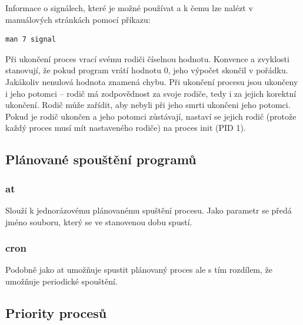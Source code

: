 \documentclass{article}
\begin{document}
Informace o signálech, které je možné používat a k čemu lze nalézt v manuálových stránkách pomocí příkazu:
\begin{verbatim}
man 7 signal
\end{verbatim}

Při ukončení proces vrací svému rodiči číselnou hodnotu. Konvence a zvyklosti stanovují, že pokud program vrátí hodnotu 0, jeho výpočet skončil v pořádku. Jakákoliv nenulová hodnota znamená chybu. Při ukončení procesu jsou ukončeny i jeho potomci -- rodič má zodpovědnost za svoje rodiče, tedy i za jejich korektní ukončení. Rodič může zařídit, aby nebyli při jeho smrti ukončeni jeho potomci. Pokud je rodič ukončen a jeho potomci zůstávají, nastaví se jejich rodič (protože každý proces musí mít nastaveného rodiče) na proces init (PID 1).

\subsection{Plánované spouštění programů}
\subsubsection{at}
Slouží k jednorázovému plánovanému spuštění procesu. Jako parametr se předá jméno souboru, který se ve stanovenou dobu spustí. 
\subsubsection{cron}
Podobně jako at umožňuje spustit plánovaný proces ale s tím rozdílem, že umožňuje periodické spouštění. 

\subsection{Priority procesů}
\end{document}
